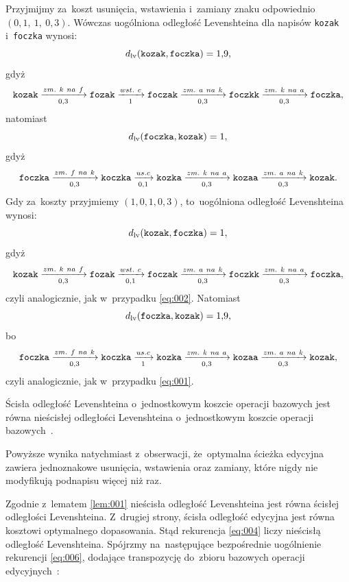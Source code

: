 \documentclass{praca1}
\begin{document}
\begin{example}
Przyjmijmy za~koszt usunięcia, wstawienia i~zamiany znaku odpowiednio $(0,\!1,\ 1,\ 0,\!3)$. Wówczas uogólniona odległość Levenshteina dla napisów \verb|kozak| i~\verb|foczka| wynosi:
\begin{equation}
\label{eq:001}
d_{\mathrm{lv}}(\verb|kozak|, \verb|foczka|) = 1{,}9,
\end{equation}
gdyż
$$
\verb|kozak|  \xrightarrow[0{,}3]{zm.\ k\ na\ f} \verb|fozak| \xrightarrow[1]{wst.\ c} \verb|foczak| \xrightarrow[0{,}3]{zm.\ a\ na\ k} \verb|foczkk| \xrightarrow[0{,}3]{zm.\ k\ na\ a} \verb|foczka|,
$$
natomiast
\begin{equation}\label{eq:002}
d_{\mathrm{lv}}(\verb|foczka|, \verb|kozak|) = 1,
\end{equation}
gdyż
$$
\verb|foczka|  \xrightarrow[0{,}3]{zm.\ f\ na\ k} \verb|koczka|  \xrightarrow[0{,}1]{us. c} \verb|kozka| \xrightarrow[0{,}3]{zm.\ k\ na\ a} \verb|kozaa| \xrightarrow[0{,}3]{zm.\ a\ na\ k} \verb|kozak|.
$$
Gdy za~koszty przyjmiemy $(1, 0{,}1, 0{,}3)$, to~uogólniona odległość Levenshteina wynosi:
$$
d_{\mathrm{lv}}(\verb|kozak|, \verb|foczka|) = 1,
$$
gdyż
$$
\verb|kozak|  \xrightarrow[0{,}3]{zm.\ k\ na\ f} \verb|fozak| \xrightarrow[0{,}1]{wst.\ c} \verb|foczak| \xrightarrow[0{,}3]{zm.\ a\ na\ k} \verb|foczkk| \xrightarrow[0{,}3]{zm.\ k\ na\ a} \verb|foczka|,
$$
czyli analogicznie, jak w~przypadku \eqref{eq:002}. Natomiast
$$
d_{\mathrm{lv}}(\verb|foczka|, \verb|kozak|) = 1{,}9,
$$
bo
$$
\verb|foczka|  \xrightarrow[0{,}3]{zm.\ f\ na\ k} \verb|koczka|  \xrightarrow[1]{us. c} \verb|kozka| \xrightarrow[0{,}3]{zm.\ k\ na\ a} \verb|kozaa| \xrightarrow[0{,}3]{zm.\ a\ na\ k} \verb|kozak|,
$$
czyli analogicznie, jak w~przypadku \eqref{eq:001}.
\end{example}


\begin{lemma}
\label{lem:001}
Ścisła odległość Levenshteina o~jednostkowym koszcie operacji bazowych jest równa nieścisłej odległości Levenshteina o~jednostkowym koszcie operacji bazowych~\cite{Boytsov2011:indexingmethods}.
\end{lemma}

Powyższe wynika natychmiast z~obserwacji, że~optymalna ścieżka edycyjna zawiera jednoznakowe usunięcia, wstawienia oraz zamiany, które nigdy nie modyfikują podnapisu więcej niż raz.


Zgodnie z~lematem \ref{lem:001} nieścisła odległość Levenshteina jest równa ścisłej odległości Levenshteina. Z~drugiej strony, ścisła odległość edycyjna jest równa kosztowi optymalnego dopasowania. Stąd rekurencja \eqref{eq:004} liczy nieścisłą odległość Levenshteina. Spójrzmy na~następujące bezpośrednie uogólnienie rekurencji \eqref{eq:006}, dodające transpozycję do~zbioru bazowych operacji edycyjnych~\cite{Boytsov2011:indexingmethods}:
\end{document}
